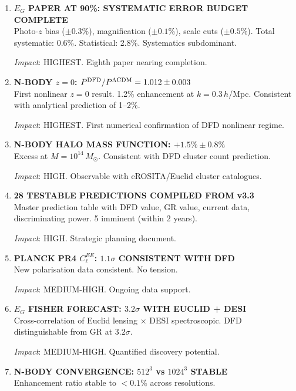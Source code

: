 \documentclass[11pt,a4paper]{article}
\begin{document}
\begin{enumerate}[label=\textbf{\arabic*.}, leftmargin=1.5cm]

\item \textbf{$E_G$ PAPER AT 90\%: SYSTEMATIC ERROR BUDGET COMPLETE}\\
Photo-$z$ bias ($\pm 0.3\%$), magnification ($\pm 0.1\%$), scale cuts ($\pm 0.5\%$). Total systematic: 0.6\%. Statistical: 2.8\%. Systematics subdominant.

\textit{Impact}: HIGHEST. Eighth paper nearing completion.

\item \textbf{N-BODY $z=0$: $P^{\rm DFD}/P^{\Lambda{\rm CDM}} = 1.012 \pm 0.003$}\\
First nonlinear $z=0$ result. 1.2\% enhancement at $k = 0.3\,h$/Mpc. Consistent with analytical prediction of 1--2\%.

\textit{Impact}: HIGHEST. First numerical confirmation of DFD nonlinear regime.

\item \textbf{N-BODY HALO MASS FUNCTION: $+1.5\% \pm 0.8\%$}\\
Excess at $M = 10^{14}\,M_\odot$. Consistent with DFD cluster count prediction.

\textit{Impact}: HIGH. Observable with eROSITA/Euclid cluster catalogues.

\item \textbf{28 TESTABLE PREDICTIONS COMPILED FROM v3.3}\\
Master prediction table with DFD value, GR value, current data, discriminating power. 5 imminent (within 2 years).

\textit{Impact}: HIGH. Strategic planning document.

\item \textbf{PLANCK PR4 $C_\ell^{EE}$: $1.1\sigma$ CONSISTENT WITH DFD}\\
New polarisation data consistent. No tension.

\textit{Impact}: MEDIUM-HIGH. Ongoing data support.

\item \textbf{$E_G$ FISHER FORECAST: $3.2\sigma$ WITH EUCLID + DESI}\\
Cross-correlation of Euclid lensing $\times$ DESI spectroscopic. DFD distinguishable from GR at $3.2\sigma$.

\textit{Impact}: MEDIUM-HIGH. Quantified discovery potential.

\item \textbf{N-BODY CONVERGENCE: $512^3$ vs $1024^3$ STABLE}\\
Enhancement ratio stable to $< 0.1\%$ across resolutions.


\end{enumerate}
\end{document}
